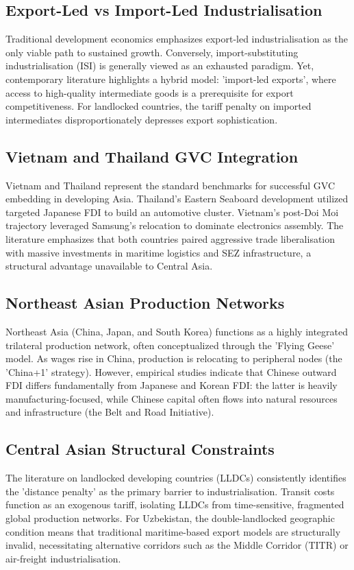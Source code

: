 \subsection{Export-Led vs Import-Led Industrialisation}
Traditional development economics emphasizes export-led industrialisation as the only viable path to sustained growth. Conversely, import-substituting industrialisation (ISI) is generally viewed as an exhausted paradigm. Yet, contemporary literature highlights a hybrid model: 'import-led exports', where access to high-quality intermediate goods is a prerequisite for export competitiveness. For landlocked countries, the tariff penalty on imported intermediates disproportionately depresses export sophistication.

\subsection{Vietnam and Thailand GVC Integration}
Vietnam and Thailand represent the standard benchmarks for successful GVC embedding in developing Asia. Thailand's Eastern Seaboard development utilized targeted Japanese FDI to build an automotive cluster. Vietnam's post-Doi Moi trajectory leveraged Samsung's relocation to dominate electronics assembly. The literature emphasizes that both countries paired aggressive trade liberalisation with massive investments in maritime logistics and SEZ infrastructure, a structural advantage unavailable to Central Asia.

\subsection{Northeast Asian Production Networks}
Northeast Asia (China, Japan, and South Korea) functions as a highly integrated trilateral production network, often conceptualized through the 'Flying Geese' model. As wages rise in China, production is relocating to peripheral nodes (the 'China+1' strategy). However, empirical studies indicate that Chinese outward FDI differs fundamentally from Japanese and Korean FDI: the latter is heavily manufacturing-focused, while Chinese capital often flows into natural resources and infrastructure (the Belt and Road Initiative). \subsection{Central Asian Structural Constraints}
The literature on landlocked developing countries (LLDCs) consistently identifies the 'distance penalty' as the primary barrier to industrialisation. Transit costs function as an exogenous tariff, isolating LLDCs from time-sensitive, fragmented global production networks. For Uzbekistan, the double-landlocked geographic condition means that traditional maritime-based export models are structurally invalid, necessitating alternative corridors such as the Middle Corridor (TITR) or air-freight industrialisation.

